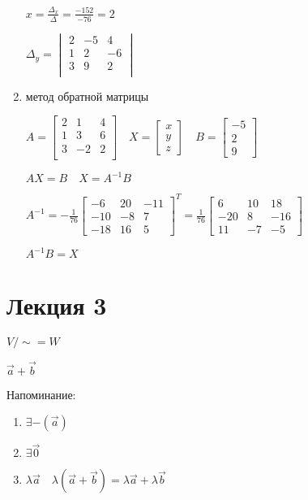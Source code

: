 \documentclass{book}
\theoremstyle{definition}
\begin{document}
\begin{enumerate}
                 $x = \frac{\Delta_x}{\Delta} = \frac{-152}{-76} = 2$

                 $\Delta_y = \begin{vmatrix} 2 & -5 & 4\\ 1 & 2 & -6\\ 3 & 9 & 2\\ \end{vmatrix} $
             \item метод обратной матрицы

                 $A = \begin{bmatrix} 2 & 1 & 4\\ 1 & 3 & 6\\ 3 & -2 & 2\\ \end{bmatrix}\quad X = \begin{bmatrix} x\\y\\z \end{bmatrix} \quad B = \begin{bmatrix} -5\\2\\9 \end{bmatrix}  $

                 $AX = B\quad X = A^{-1}B$

                 $A^{-1} = -\frac{1}{76}\begin{bmatrix} -6 & 20 & -11\\ -10 & -8 & 7\\ -18 & 16 & 5  \end{bmatrix}^T = \frac{1}{76}\begin{bmatrix} 6 & 10 & 18 \\ -20 & 8 & -16 \\ 11 & -7 & -5 \end{bmatrix}  $

                 $A^{-1}B = X$
        \end{enumerate}


        \section{Лекция 3}

        $V / \sim = W$ 

        $\vec a + \vec b$

        Напоминание:
        \begin{enumerate}
            \item $\exists -(\vec a)$
            \item $\exists \vec 0$
            \item $\lambda \vec a\quad \lambda (\vec a  + \vec b) = \lambda \vec a + \lambda \vec b$
        \end{enumerate}
\end{document}

